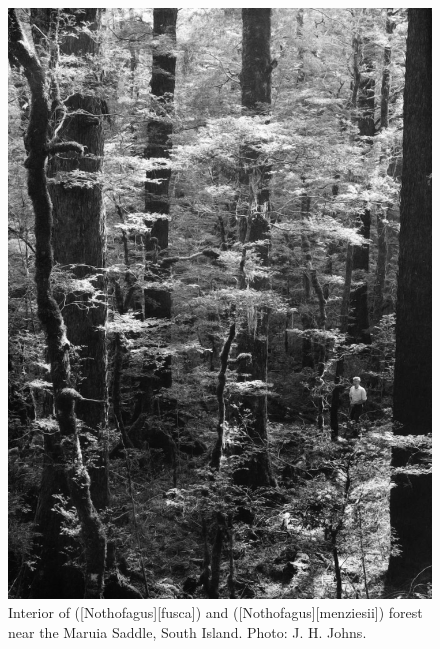 \begin{figure}[t]
\begin{minipage}[t]{\textwidth}
\begin{minipage}[t]{(\textwidth-\fgap) * \real{0.499}}
			\includegraphics[width=\textwidth]{graphics/fig_072}
			\caption[Interior of red beech and silver beech forest]{Interior of  ([Nothofagus][fusca]) and  ([Nothofagus][menziesii]) forest near the Maruia Saddle, South Island.
			Photo: J. H. Johns.}%
			\label{fig:72beech}
		\end{minipage}
	\end{minipage}
\end{figure}

